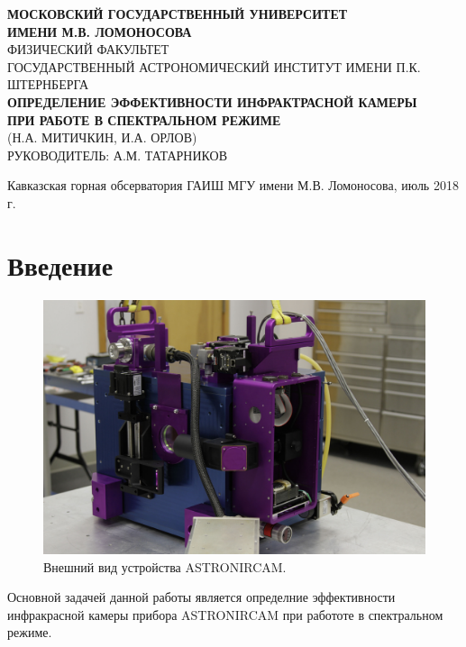 \documentclass[a4paper]{article}
\begin{document}
\setcounter{page}{0} 
\begin{titlepage}
\begin{center}
\large{\textbf{МОСКОВСКИЙ ГОСУДАРСТВЕННЫЙ УНИВЕРСИТЕТ\\ИМЕНИ М.В. ЛОМОНОСОВА}}\\
\hfill\break
\normalsize{ФИЗИЧЕСКИЙ ФАКУЛЬТЕТ}\\
\hfill\break
\normalsize{ГОСУДАРСТВЕННЫЙ АСТРОНОМИЧЕСКИЙ ИНСТИТУТ ИМЕНИ П.К. ШТЕРНБЕРГА}\\
\hfill\break
\hfill\break
\hfill\break
\hfill\break
\hfill\break
\hfill\break
\hfill\break
\hfill\break
\hfill\break
\hfill\break
\Large{\textbf{ОПРЕДЕЛЕНИЕ ЭФФЕКТИВНОСТИ ИНФРАКТРАСНОЙ КАМЕРЫ\\ПРИ РАБОТЕ В СПЕКТРАЛЬНОМ РЕЖИМЕ}}\\
\hfill\break
\normalsize{(Н.А. МИТИЧКИН, И.А. ОРЛОВ)}\\
\hfill\break
\normalsize{РУКОВОДИТЕЛЬ: А.М. ТАТАРНИКОВ}\\
\end{center}
\hfill\break
\hfill\break
\hfill\break
\hfill\break
\hfill\break
\hfill\break
\hfill\break
\hfill\break
\hfill\break
\hfill\break
\hfill\break
\hfill\break
\hfill\break
\hfill\break
\hfill\break
\hfill\break 
\hfill\break
\hfill\break
\hfill\break
\begin{center}
Кавказская горная обсерватория ГАИШ МГУ имени М.В. Ломоносова, июль 2018 г.
\end{center}
\thispagestyle{empty}
\end{titlepage}
\newpage
\tableofcontents
\newpage
\section{Введение}
\begin{figure} 
\vspace{-4ex}
\includegraphics[width=\linewidth]{11}
\caption{Внешний вид устройства ASTRONIRCAM.}
\label{fig:1}
\end{figure}
Основной задачей данной работы является определние эффективности инфракрасной камеры прибора ASTRONIRCAM при работоте в спектральном режиме.
\end{document}
